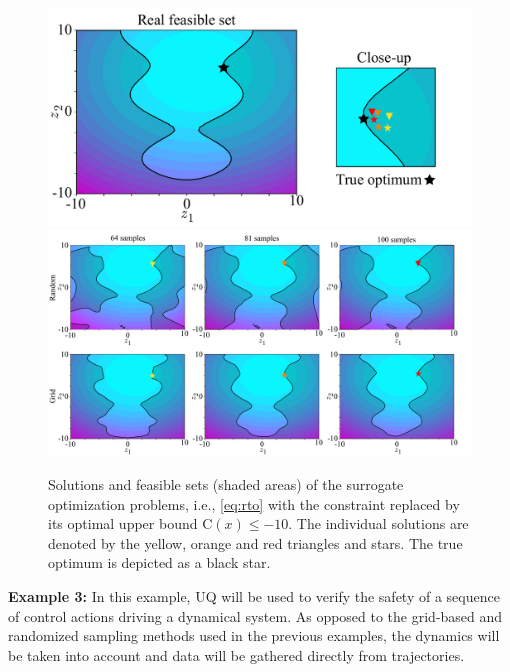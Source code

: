 \begin{figure}[t]
	\centering
	\includegraphics[scale=0.25]{../images/chap2_numex_ex2_gt.pdf} \\
	\includegraphics[scale=0.25]{../images/chap2_numex_ex2_res.pdf}
	\caption{Solutions and feasible sets (shaded areas) of the surrogate optimization problems, i.e., \eqref{eq:rto} with the constraint replaced by its optimal upper bound C$(x) \leq -10$. The individual solutions are denoted by the yellow, orange and red triangles and stars. The true optimum is depicted as a black star.}
	\label{fig:constraints}
\end{figure}

\textbf{Example 3:} In this example, UQ will be used to verify the safety of a sequence of control actions driving a dynamical system. As opposed to the grid-based and randomized sampling methods used in the previous examples, the dynamics will be taken into account and data will be gathered directly from trajectories.

